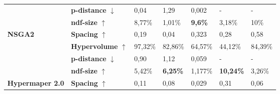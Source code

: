 \begin{table}[h]
\begin{tabular}{@{}lllllll@{}}
                                                                                              & \textbf{p-distance} $\downarrow$  & 0,04                                     & 1,29                                     & 0,002                                     & -                                        & -                                        \\
                                                                                              & \textbf{ndf-size} $\uparrow$     & 8,77\%                                   & 1,01\%                                   & \cellcolor[HTML]{EFEFEF}\textbf{9,6\%}    & 3,18\%                                   & 10\%                                     \\
    \multirow{-4}{*}{\textbf{NSGA2}}                                                          & \textbf{Spacing} $\uparrow$      & 0,19                                     & 0,04                                     & 0,323                                     & 0,28                                     & 0,58                                     \\ \midrule
                                                                                              & \textbf{Hypervolume} $\uparrow$  & 97,32\%                                  & 82,86\%                                  & 64,57\%                                   & 44,12\%                                  & 84,39\%                                  \\ 
                                                                                              & \textbf{p-distance} $\downarrow$  & 0,90                                     & 1,12                                     & 0,059                                     & -                                        & -                                        \\
                                                                                              & \textbf{ndf-size} $\uparrow$     & 5,42\%                                   & \cellcolor[HTML]{EFEFEF}\textbf{6,25\%}  & 1,177\%                                   & \cellcolor[HTML]{EFEFEF}\textbf{10,24\%} & 3,26\%                                   \\
    \multirow{-4}{*}{\textbf{Hypermaper 2.0}}                                                     & \textbf{Spacing} $\uparrow$      & 0,11                                     & 0,08                                     & 0,029                                     & 0,31                                     & 0,06                                     \\ \midrule

\end{tabular}
\end{table}
